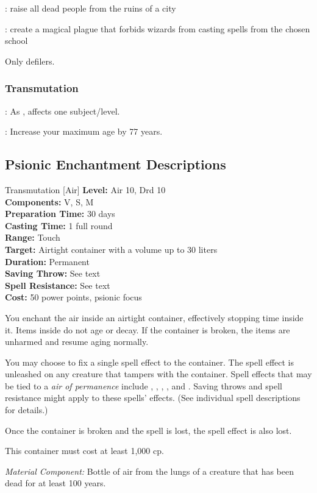 : raise all dead people from the ruins of a city

: create a magical plague that forbids wizards from casting spells from the chosen school

 Only defilers.


\subsubsection{Transmutation}
: As , affects one subject/level. %

: Increase your maximum age by 77 years.


\subsection{Psionic Enchantment Descriptions}

{Transmutation [Air]}
{
    \textbf{Level:}
    Air 10, Drd 10\\
    \textbf{Components:}
    V, S, M\\
    \textbf{Preparation Time:}
    30 days\\
    \textbf{Casting Time:}
    1 full round\\
    \textbf{Range:}
    Touch\\
    \textbf{Target:}
    Airtight container with a volume up to 30 liters\\
    \textbf{Duration:}
    Permanent\\
    \textbf{Saving Throw:}
    See text\\
    \textbf{Spell Resistance:}
    See text\\
    \textbf{Cost:}
    50 power points, psionic focus\\
}
{
    You enchant the air inside an airtight container, effectively stopping time inside it. Items inside do not age or decay. If the container is broken, the items are unharmed and resume aging normally.

    You may choose to fix a single spell effect to the container. The spell effect is unleashed on any creature that tampers with the container. Spell effects that may be tied to a \emph{air of permanence} include , , , , and . Saving throws and spell resistance might apply to these spells' effects. (See individual spell descriptions for details.)

    Once the container is broken and the spell is lost, the spell effect is also lost.

    This container must cost at least 1,000 cp.

    \textit{Material Component:} Bottle of air from the lungs of a creature that has been dead for at least 100 years.
}
